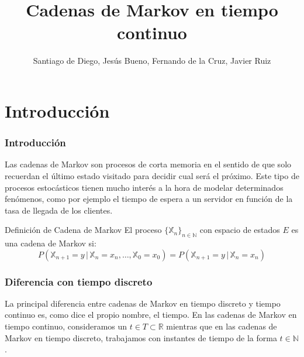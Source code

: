 \documentclass{beamer}
\title[CMTC]{Cadenas de Markov en tiempo continuo}
\author[Santiago,Jesus,Fernando]{Santiago de Diego, Jesús Bueno, Fernando de la Cruz, Javier Ruiz}
\date{}
\begin{document}
\frame{\titlepage}



\section{Introducción}
\begin{frame}
    \frametitle{Introducción}
     Las cadenas de Markov son procesos de corta memoria en el sentido de que solo recuerdan el último estado visitado para decidir cual será el próximo.
     \newline
     \newline
     Este tipo de procesos estocásticos tienen mucho interés a la hora de modelar determinados fenómenos, como por ejemplo el tiempo de espera a un servidor en función de la tasa de llegada de los clientes.
  \end{frame}
  \begin{frame}
       \begin{block}{Definición de Cadena de Markov}
  		 El proceso $\{\mathbb{X}_n \}_{n\in \mathbb{N}}$ con espacio de estados $E$ es una cadena de Markov si:
$$P(\mathbb{X}_{n+1}=y \, | \, \mathbb{X}_n = x_n , \ldots , \mathbb{X}_0 = x_0)=P(\mathbb{X}_{n+1}=y \, | \, {\mathbb{X}_n=x_n})$$
  		\end{block}
  	\end{frame}
\begin{frame}
\frametitle{Diferencia con tiempo discreto}
La principal diferencia entre cadenas de Markov en tiempo discreto y tiempo continuo es, como dice el propio nombre, el tiempo.
\newline
\newline
En las cadenas de Markov en tiempo continuo, consideramos un $t\in T \subset \mathbb{R}$ mientras que en las cadenas de Markov en tiempo discreto, trabajamos con instantes de tiempo de la forma $t\in \mathbb{N}$.
\end{frame}
\end{document}
